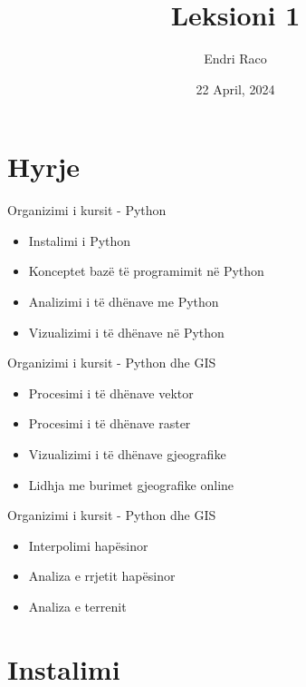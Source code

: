 \documentclass[
  ignorenonframetext,
]{beamer}
\title{Leksioni 1}
\author{Endri Raco}
\date{22 April, 2024}
\begin{document}
\frame{\titlepage}

\begin{frame}[allowframebreaks]
  \tableofcontents[hideallsubsections]
\end{frame}
\hypertarget{hyrje}{%
\section*{Hyrje}\label{hyrje}}

\begin{frame}{Organizimi i kursit - Python}
\protect\hypertarget{organizimi-i-kursit---python}{}
\begin{itemize}
\item
  Instalimi i Python
\item
  Konceptet bazë të programimit në Python
\item
  Analizimi i të dhënave me Python
\item
  Vizualizimi i të dhënave në Python
\end{itemize}
\end{frame}

\begin{frame}{Organizimi i kursit - Python dhe GIS}
\protect\hypertarget{organizimi-i-kursit---python-dhe-gis}{}
\begin{itemize}
\item
  Procesimi i të dhënave vektor
\item
  Procesimi i të dhënave raster
\item
  Vizualizimi i të dhënave gjeografike
\item
  Lidhja me burimet gjeografike online
\end{itemize}
\end{frame}

\begin{frame}{Organizimi i kursit - Python dhe GIS}
\protect\hypertarget{organizimi-i-kursit---python-dhe-gis-1}{}
\begin{itemize}
\item
  Interpolimi hapësinor
\item
  Analiza e rrjetit hapësinor
\item
  Analiza e terrenit
\end{itemize}
\end{frame}

\hypertarget{instalimi}{%
\section*{Instalimi}\label{instalimi}}
\end{document}
